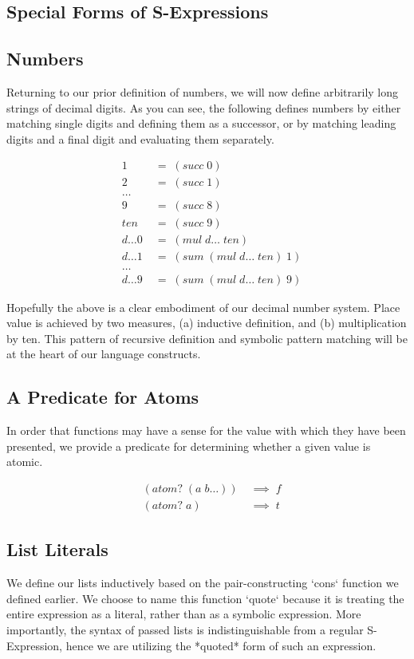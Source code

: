 \documentclass[11pt]{article}
\begin{document}
\subsection{Special Forms of S-Expressions}
\subsection{Numbers}
Returning to our prior definition of numbers, we will now define arbitrarily long strings of decimal digits. As you can see, the following defines numbers by either matching single digits and defining them as a successor, or by matching leading digits and a final digit and evaluating them separately.

\begin{align*}
& 1 \; &= \; (succ \; 0)
\\& 2 \; &= \; (succ \; 1)
\\& \dots
\\& 9 \; &= \; (succ \; 8)
\\& ten \; &= \; (succ \; 9)
\\& d\dots0 \; &= \; (mul \; d\dots \; ten)
\\& d\dots1 \; &= \; (sum \; (mul \; d\dots \; ten) \; 1)
\\& \dots
\\& d\dots9 \; &= \; (sum \; (mul \; d\dots \; ten) \; 9)
\end{align*}

Hopefully the above is a clear embodiment of our decimal number system. Place value is achieved by two measures, (a) inductive definition, and (b) multiplication by ten. This pattern of recursive definition and symbolic pattern matching will be at the heart of our language constructs.

\subsection{A Predicate for Atoms}
In order that functions may have a sense for the value with which they have been presented, we provide a predicate for determining whether a given value is atomic.

\begin{align*}
& (atom? \; (a \; b\dots)) \; &\implies \; f
\\& (atom? \; a) \; &\implies \; t
\end{align*}

\subsection{List Literals}
We define our lists inductively based on the pair-constructing `cons` function we defined earlier. We choose to name this function `quote` because it is treating the entire expression as a literal, rather than as a symbolic expression. More importantly, the syntax of passed lists is indistinguishable from a regular S-Expression, hence we are utilizing the *quoted* form of such an expression.
\end{document}
